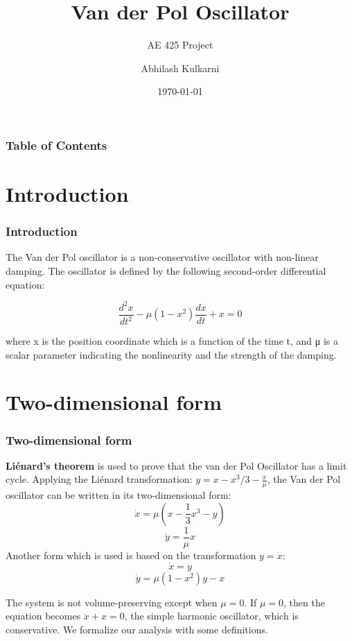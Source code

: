 \documentclass[10pt]{beamer}
\title{Van der Pol Oscillator}
\subtitle{AE 425 Project}
\institute{Indian Institute of Technology Bombay}
\date{\today}
\author{Abhilash Kulkarni}
\begin{document}
	\begin{frame}[plain]
		\maketitle
	\end{frame}

	\begin{frame}
		\frametitle{Table of Contents}
		\tableofcontents 
	\end{frame}

	\section{Introduction}
		\begin{frame}
			\frametitle{Introduction}
			The Van der Pol oscillator is a non-conservative oscillator with non-linear damping. The oscillator is defined by the following second-order differential equation:

			\begin{equation}
			\frac{d^2x}{dt^2} - \mu(1 - x^2)\frac{dx}{dt} + x = 0
			\end{equation}

			where x is the position coordinate which is a function of the time t, and μ is a scalar parameter indicating the nonlinearity and the strength of the damping.
		\end{frame}
	\section{Two-dimensional form}
		\begin{frame}
		\frametitle{Two-dimensional form}
		\textbf{Liénard's theorem\cite{wiki}} is used to prove that the van der Pol Oscillator has a limit cycle. Applying the Liénard transformation: $y = x - x^3/3 - \frac{\dot{x}}{\mu}$, the Van der Pol oscillator can be written in its two-dimensional form:
		\begin{equation}
		\dot{x} = \mu(x - \frac{1}{3}x^3 - y)
		\end{equation}
		\begin{equation}
		\dot{y} = \frac{1}{\mu}x
		\end{equation}
		Another form which is used is based on the transformation $y = \dot{x}$:
		\begin{equation}
		\dot{x} = y
		\end{equation}
		\begin{equation}
		\dot{y} = \mu(1 - x^2)y - x
		\end{equation}
		\end{frame}
\pagebreak
\begin{frame}
The system is not volume-preserving except when $\mu = 0$\cite{cornell}. If $\mu = 0$, then the equation becomes $\ddot{x} + x = 0$, the simple harmonic oscillator, which is conservative. We formalize our analysis with some definitions.
\end{frame}

{}

\end{document}
